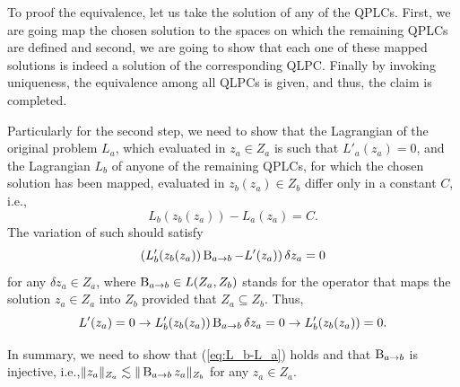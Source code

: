 To proof the equivalence, let us take the solution of any of the QPLCs. First, we are going map the chosen solution to the spaces on which the remaining QPLCs are defined and second, we are going to show that each one of these mapped solutions is indeed a solution of the corresponding QLPC. Finally by invoking uniqueness, the equivalence among all QLPCs is given, and thus, the claim is completed.

Particularly for the second step, we need to show that the Lagrangian of the original problem $L_a$, which evaluated in $z_a \in Z_a $ is such that $L'_a(z_a) = 0$, and the Lagrangian $L_b$ of anyone of the remaining QPLCs, for which the chosen solution has been mapped, evaluated in  $z_b(z_a) \in Z_b$ differ only in a constant $C$, i.e., 
\begin{equation}
L_b(z_b(z_a))-L_a(z_a) = C.
\label{eq:L_b-L_a}
\end{equation}
The variation of such should satisfy
\begin{equation}
\left(L_b'(z_b(z_a))\operatorname{B}_{a \to b}-L'(z_a)\right)\delta z_a = 0    
\end{equation}
for any $\delta z_a \in Z_a$, where $\operatorname{B}_{a \to b} \in L(Z_a, Z_b)$ stands for the operator that maps the solution $z_a \in Z_a$ into $Z_b$ provided that $Z_a \subseteq Z_b$. Thus,
\begin{equation}
L'(z_a) = 0 \rightarrow L_b'(z_b(z_a))\operatorname{B}_{a \to b} \delta z_a = 0 \rightarrow L_b'(z_b(z_a)) = 0.
\end{equation}

In summary, we need to show that (\ref{eq:L_b-L_a}) holds and that $\operatorname{B}_{a \to b}$ is injective, i.e.,$\|z_a\|_{Z_a} \lesssim \|\operatorname{B}_{a \to b} z_a\|_{Z_b}$ for any $z_a \in Z_a$.

